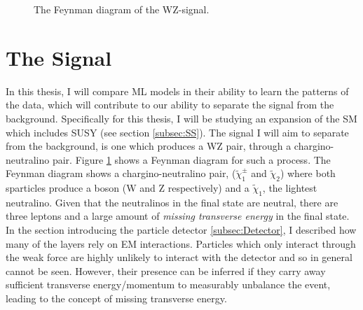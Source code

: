 \begin{figure}[H]
    \centering
    \caption{The Feynman diagram of the WZ-signal.}
    \label{fig:signal}
\end{figure}
\section{The Signal}\label{sec:signal}
In this thesis, I will compare \ac{ML} models in their ability to learn the patterns of the data, which will contribute  
to our ability to separate the signal from the background. Specifically for this thesis, I will be studying an expansion of the 
\ac{SM} which includes \ac{SUSY} (see section \ref{subsec:SS}). The signal I will aim to separate from the background, is one 
which produces a WZ pair, through a chargino-neutralino pair. Figure \ref{fig:signal} shows a Feynman diagram for 
such a process. The Feynman diagram shows a chargino-neutralino pair, ($\tilde{\chi}_1^\pm$ and $\tilde{\chi}_2$)
where both sparticles produce a boson (W and Z respectively) and a $\tilde{\chi}_1$, the lightest neutralino. Given that the 
neutralinos in the final state are neutral, there are three leptons and a large amount of \emph{missing transverse energy} in the final state.
In the section introducing the particle detector \ref{subsec:Detector}, I described how many of the layers rely on \ac{EM} interactions. 
Particles which only interact through the weak force are highly unlikely to interact with the detector and so in general cannot be seen. 
However, their presence can be inferred if they carry away sufficient transverse energy/momentum to measurably unbalance the event, leading to the concept of 
missing transverse energy.
